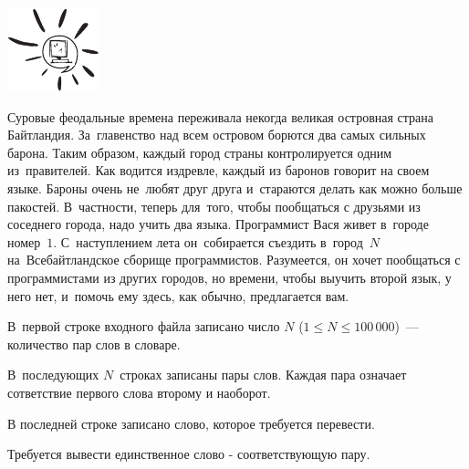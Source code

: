 \foo

\includegraphics{sis-logo.pdf}

Суровые феодальные времена переживала некогда великая островная страна
Байтландия. За~главенство над всем островом борются два самых сильных барона.
Таким образом, каждый город страны контролируется одним из~правителей. Как
водится издревле, каждый из баронов говорит на своем языке. Бароны очень
не~любят друг друга и~стараются делать как можно больше пакостей. В~частности,
теперь для~того, чтобы пообщаться с друзьями из соседнего города, надо учить два
языка. Программист Вася живет в~городе номер~$1$. С~наступлением лета
он~собирается съездить в~город~$N$ на~Всебайтландское сборище программистов.
Разумеется, он хочет пообщаться с программистами из других городов, но  времени,
чтобы выучить второй язык, у него нет, и~помочь ему здесь, как обычно, предлагается вам.


\InputFile
В~первой строке входного файла записано число $N$ ($1 \leqslant N \leqslant
100\,000$)~--- количество пар слов в словаре.

В~последующих $N$~строках записаны пары слов. Каждая пара означает сответствие
первого слова второму и наоборот.

В последней строке записано слово, которое требуется перевести.

\OutputFile
Требуется вывести единственное слово - соответствующую пару.
